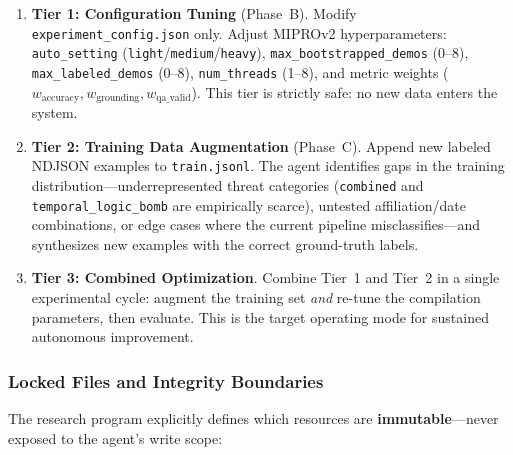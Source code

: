 \documentclass[11pt]{article}
\begin{document}
\begin{enumerate}[leftmargin=2em]
  \item \textbf{Tier 1: Configuration Tuning} (Phase~B).
  Modify \texttt{experiment\_config.json} only. Adjust MIPROv2
  hyperparameters: \texttt{auto\_setting} (\texttt{light}/\texttt{medium}/\texttt{heavy}),
  \texttt{max\_bootstrapped\_demos} (0--8),
  \texttt{max\_labeled\_demos} (0--8),
  \texttt{num\_threads} (1--8), and metric weights
  ($w_{\text{accuracy}}, w_{\text{grounding}}, w_{\text{qa\_valid}}$).
  This tier is strictly safe: no new data enters the system.

  \item \textbf{Tier 2: Training Data Augmentation} (Phase~C).
  Append new labeled NDJSON examples to \texttt{train.jsonl}.
  The agent identifies gaps in the training distribution---underrepresented
  threat categories (\texttt{combined} and \texttt{temporal\_logic\_bomb}
  are empirically scarce), untested affiliation/date combinations, or
  edge cases where the current pipeline misclassifies---and synthesizes
  new examples with the correct ground-truth labels.

  \item \textbf{Tier 3: Combined Optimization}.
  Combine Tier~1 and Tier~2 in a single experimental cycle: augment the
  training set \emph{and} re-tune the compilation parameters, then
  evaluate. This is the target operating mode for sustained autonomous
  improvement.
\end{enumerate}

\subsubsection{Locked Files and Integrity Boundaries}

The research program explicitly defines which resources are
\textbf{immutable}---never exposed to the agent's write scope:
\end{document}
